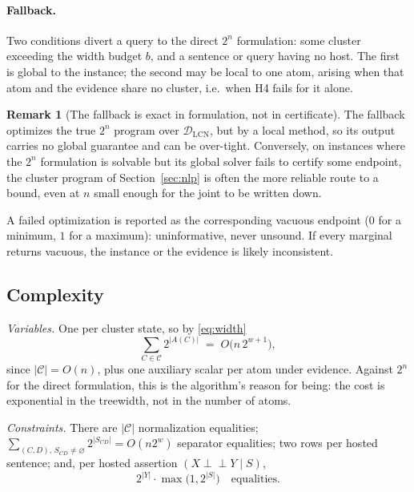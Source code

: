 \documentclass[11pt]{article}
\theoremstyle{definition}
\newtheorem{remark}{Remark}
\newcommand{\indep}{\perp\!\!\!\perp}
\newcommand{\DLCN}{\mathcal{D}_{\mathrm{LCN}}}
\begin{document}
\paragraph{Fallback.}
Two conditions divert a query to the direct $2^n$ formulation: some cluster
exceeding the width budget $b$, and a sentence or query having no host. The first
is global to the instance; the second may be local to one atom, arising when that
atom and the evidence share no cluster, i.e.\ when H4 fails for it alone.

\begin{remark}[The fallback is exact in formulation, not in certificate]\label{rem:oracle}
The fallback optimizes the true $2^n$ program over $\DLCN$, but by a local method,
so its output carries no global guarantee and can be over-tight. Conversely, on
instances where the $2^n$ formulation is solvable but its global solver fails to
certify some endpoint, the cluster program of Section~\ref{sec:nlp} is often the
more reliable route to a bound, even at $n$ small enough for the joint to be
written down.
\end{remark}

A failed optimization is reported as the corresponding vacuous endpoint ($0$ for a
minimum, $1$ for a maximum): uninformative, never unsound. If every marginal
returns vacuous, the instance or the evidence is likely inconsistent.

\subsection{Complexity}\label{sec:algo-complexity}

\emph{Variables.} One per cluster state, so by \eqref{eq:width}
\begin{equation}\label{eq:cost}
  \sum_{C\in\mathcal C}2^{|A(C)|}\;=\;O\!\bigl(n\,2^{w+1}\bigr),
\end{equation}
since $|\mathcal C|=O(n)$, plus one auxiliary scalar per atom under evidence.
Against $2^n$ for the direct formulation, this is the algorithm's reason for
being: the cost is exponential in the treewidth, not in the number of atoms.

\emph{Constraints.} There are $|\mathcal C|$ normalization equalities;
$\sum_{(C,D),\,S_{CD}\ne\varnothing}2^{|S_{CD}|}=O(n2^{w})$ separator equalities;
two rows per hosted sentence; and, per hosted assertion $(X\indep Y\mid S)$,
\begin{equation}\label{eq:lmcrows}
  2^{|Y|}\cdot\max\bigl(1,2^{|S|}\bigr)\quad\text{equalities.}
\end{equation}
\end{document}

